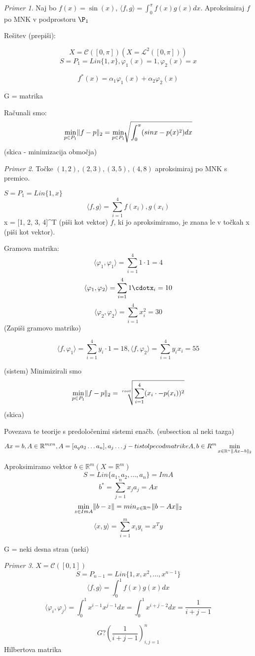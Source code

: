 \documentclass[a4paper,12pt]{article}
\DeclarePairedDelimiter\norm{\lVert}{\rVert}
\newcommand{\innerproduct}[2]{\langle #1, #2 \rangle}
\theoremstyle{definition}
\theoremstyle{remark}
\newtheorem*{ex}{Primer}
\newcommand{\R}{\mathbb{R}}
\begin{document}
\begin{ex}
    Naj bo $f(x) = \sin (x)$, $\innerproduct{f}{g} = \int_{0}^{\pi} f(x) g(x) dx$. Aproksimiraj $f$ po MNK v podprostoru $\P_1$
\end{ex}
Rešitev (prepiši):

\[X = \mathscr{C} ([0, \pi]) (X = \mathscr{L}^2 ([0, \pi]))\]
\[S = P_1 = Lin\{1, x\}, \varphi_1(x) = 1, \varphi_2 (x) = x\]

\[f^*(x) = \alpha_1 \varphi_1(x) + \alpha_2 \varphi_2(x)\]

G = matrika

Računali smo:
\[\min_{p \in P_1} \norm{f - p}_2 = \min_{p \in P_1} \sqrt[]{\int_{0}^{\pi} (sinx - p(x)^2) dx}\]
(skica - minimizacija območja)

\begin{ex}
    Točke $(1, 2), (2, 3), (3, 5), (4, 8)$ aproksimiraj po MNK s premico.

    $S = P_1 = Lin\{1, x\}$
    \[\innerproduct{f}{g} = \sum_{i = 1}^{4} f(x_i), g(x_i)\]
    x = [1, 2, 3, 4]^T (piši kot vektor)
    $f$, ki jo aproksimiramo, je znana le v točkah x (piši kot vektor).

    Gramova matrika:
    \[\innerproduct{\varphi_1}{\varphi_1} = \sum_{i = 1}^{4}1\cdot1 = 4\]
    \[\innerproduct{\varphi_1}{\varphi_2} = \sum_{i = 1}^{4}1\cdotx_i = 10\]
    \[\innerproduct{\varphi_2}{\varphi_2} = \sum_{i = 1}^{4}x_i^2 = 30\]
    (Zapiši gramovo matriko)

    \[\innerproduct{f}{\varphi_1} = \sum_{i = 1}^{4} y_i \cdot 1 = 18, \innerproduct{f}{\varphi_2} = \sum_{i = 1}^{4} y_i x_i = 55\]

    (sistem)
    Minimizirali smo
    \begin{equation}
        \min_{p \in P_1} \norm{f - p}_2 =\sqrt[root]{\sum_{i = 1}^{4} (x_i \cdot -p(x_i))^2}
    \end{equation}
    (skica)
\end{ex}


Povezava te teorije s predoločenimi sistemi enačb. (subsection al neki tazga)

\begin{equation}
    Ax = b, A\in \R^{mxn}, A = [a_q a_2 \dots a_n], a_j \dots j-ti stolpec od matrike A, b \in R^m\\
    \min_{x \in \R^n \norm{Ax - b}_2}
\end{equation}

Aproksimiramo vektor $b \in \R^m (X = \R^m)$
\[S = Lin\{a_1, a_2, \dots, a_n\} = ImA\]
\[b^* = \sum_{j = 1}^{n}x_j a_j = Ax\]
\[\min_{z \in ImA} \norm{b-z} = min_{x \in \R^m} \norm{b-Ax}_2\]
\[\innerproduct{x}{y} = \sum_{i = 1}^{m}x_i y_i = x^T y\]

G = neki
desna stran (neki)

\begin{ex}
    $X = \mathscr{C} ([0, 1])$
    \[S = P_{n-1} = Lin\{1, x, x^2, \dots, x^{n-1}\}\]
    \[\innerproduct{f}{g} = \int_{0}^{1} f(x) g(x) dx\]
    \[\innerproduct{\varphi_i}{\varphi_j} = \int_{0}^{1} x^{i-1} x^{j-1} dx = \int_{0}^{1}x^{i+j-2} dx = \frac{1}{i+j-1}\]

    \[G ? (\frac{1}{i+j-1})_{i, j = 1}^n\]
    Hilbertova matrika
\end{ex}
\end{document}
